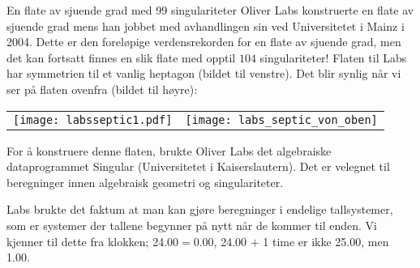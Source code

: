 \begin{surferPage}[99 singulariteter]{En flate av sjuende grad med 99 singulariteter}
	Oliver Labs konstruerte en flate av sjuende grad mens han jobbet med avhandlingen sin 
	ved Universitetet i Mainz i 2004. Dette er den foreløpige verdensrekorden for en flate av sjuende 
	grad, men det kan fortsatt finnes en slik flate med opptil $104$ singulariteter! Flaten til Labs har 
	symmetrien til et vanlig heptagon (bildet til venstre). Det blir synlig når vi ser på flaten ovenfra (bildet til høyre):
	
    \vspace*{-0.3em}
    \begin{center}
      \begin{tabular}{c@{\qquad}c}
        \texttt{[image: labsseptic1.pdf]}
        &
        \texttt{[image: labs\_septic\_von\_oben]}
      \end{tabular}
    \end{center}
    \vspace*{-0.3em}
	
	For å konstruere denne flaten, brukte Oliver Labs det algebraiske dataprogrammet {\sc Singular} 
	(Universitetet i Kaiserslautern). Det er velegnet til beregninger innen algebraisk geometri og singulariteter. 

	Labs brukte det faktum at man kan gjøre beregninger i endelige tallsystemer, som er systemer der tallene begynner 
	på nytt når de kommer til enden. Vi kjenner til dette fra klokken; 24.00$=$0.00, 24.00 $+$ 1 time er ikke 25.00, men 1.00.
\end{surferPage}
